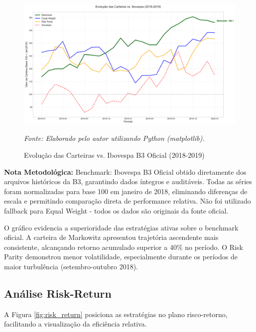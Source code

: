 \begin{figure}[H]
\centering
\includegraphics[width=\textwidth]{images/portfolio_evolution.png}
\caption{Evolução das Carteiras vs. Ibovespa B3 Oficial (2018-2019)}
\textit{Fonte: Elaborado pelo autor utilizando Python (matplotlib).}
\label{fig:portfolio_evolution}
\end{figure}

\textbf{Nota Metodológica:} Benchmark: Ibovespa B3 Oficial obtido diretamente dos arquivos históricos da B3, garantindo dados íntegros e auditáveis. Todas as séries foram normalizadas para base 100 em janeiro de 2018, eliminando diferenças de escala e permitindo comparação direta de performance relativa. Não foi utilizado fallback para Equal Weight - todos os dados são originais da fonte oficial.

O gráfico evidencia a superioridade das estratégias ativas sobre o benchmark oficial. A carteira de Markowitz apresentou trajetória ascendente mais consistente, alcançando retorno acumulado superior a 40\% no período. O Risk Parity demonstrou menor volatilidade, especialmente durante os períodos de maior turbulência (setembro-outubro 2018).

\subsection{Análise Risk-Return}

A Figura \ref{fig:risk_return} posiciona as estratégias no plano risco-retorno, facilitando a visualização da eficiência relativa.

